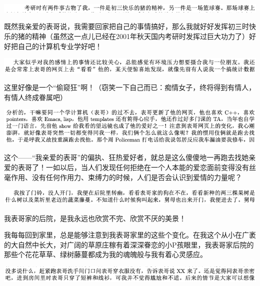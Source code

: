 \documentclass[9pt, b5paper]{article}
\begin{document}
\begin{center}
\includegraphics[width=.9\linewidth]{./pic/backups_plans_20210502_094250.png}
\end{center}

既然我亲爱的表哥说，我需要回家把自己的事情搞好，那么我就好好发挥初三时快乐的猪的精神（虽然这一点儿已经在2001年秋天国内考研时发挥过巨大功力了）好好把自己的计算机专业学好吧！

\begin{center}
\includegraphics[width=.9\linewidth]{./pic/backups_plans_20210502_094424.png}
\end{center}

这里好像是一个“偷窥狂”啊！（窃笑一下自己而已：痴情女子，终将得到有情人，有情人终成眷属吧）

\begin{center}
\includegraphics[width=.9\linewidth]{./pic/backups_plans_20210502_094459.png}
\end{center}

这个——“我亲爱的表哥”的偏执、狂热爱好者，就总是这么傻傻地一再跑去找她亲爱的表哥了！一如以后，当人们发现任何拒绝在一个人本能的爱恋面前变得没有丝毫作用、没有任何作用力、束缚力的时候，人们是否会认识到爱情的力量呢？

\begin{center}
\includegraphics[width=.9\linewidth]{./pic/backups_plans_20210502_094658.png}
\end{center}

我表哥家的后院，是我永远也欣赏不完、欣赏不厌的美景！

我每每回到家里，总是能够注意到我表哥家里的这些个变化。在我这个从小在广袤的大自然中长大，对广阔的草原庄稼有着深深眷恋的小P孩眼里，我表哥家后院的那些个花花草草、绿树藤蔓都成为我的魂魄般与我有着心灵感应。 

\begin{center}
\includegraphics[width=.9\linewidth]{./pic/backups_plans_20210502_094751.png}
\end{center}
\end{document}
